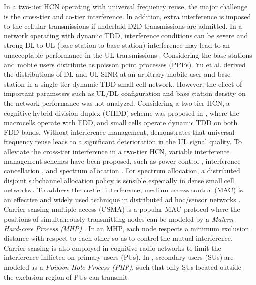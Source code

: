 \documentclass[twocolumn,english]{IEEEtran}
\theoremstyle{plain}
\theoremstyle{definition}
\begin{document}
In a two-tier HCN operating with universal frequency reuse, the major
challenge is the cross-tier and co-tier interference. In addition,
extra interference is imposed to the cellular transmissions if underlaid
D2D transmissions are admitted. In a network operating with dynamic
TDD, interference conditions can be severe and strong DL-to-UL (base
station-to-base station) interference may lead to an unacceptable
performance in the UL transmissions \cite{DTAF}. Considering the
base stations and mobile users distribute as poisson point processes
(PPPs), Yu et al. \cite{DTSI} derived the distributions of DL and
UL SINR at an arbitrary mobile user and base station in a single tier
dynamic TDD small cell network. However, the effect of important parameters
such as UL/DL configuration and base station density on the network
performance was not analyzed. Considering a two-tier HCN, a cognitive
hybrid division duplex (CHDD) scheme was proposed in \cite{CHDD},
where the macrocells operate with FDD, and small cells operate dynamic
TDD on both FDD bands. Without interference management, \cite{CHDD}
demonstrates that universal frequency reuse leads to a significant
deterioration in the UL signal quality. To alleviate the cross-tier
interference in a two-tier HCN, variable interference management schemes
have been proposed, such as power control \cite{PCIT}, interference
cancellation \cite{SICIH}, and spectrum allocation \cite{SAIT}.
For spectrum allocation, a distributed disjoint subchannel allocation
policy is sensible especially in dense small cell networks \cite{SAIT}.
To address the co-tier interference, medium access control (MAC) is
an effective and widely used technique in distributed ad hoc/sensor
networks \cite{ASGM,MIIH,AMHC,IAOI}. Carrier sensing multiple access
(CSMA) is a popular MAC protocol where the positions of simultaneously
transmitting nodes can be modeled by a \emph{Matern Hard-core Process
(MHP)} \cite{ASGM,MIIH,AMHC}. In an MHP, each node respects a minimum
exclusion distance with respect to each other so as to control the
mutual interference. Carrier sensing is also employed in cognitive
radio networks to limit the interference inflicted on primary users
(PUs). In \cite{IAOI}, secondary users (SUs) are modeled as a\emph{
Poisson Hole Process (PHP)}, such that only SUs located outside the
exclusion region of PUs can transmit.
\end{document}
